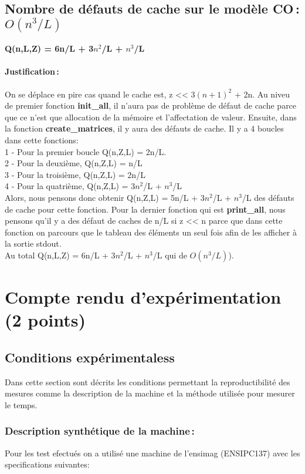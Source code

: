 \documentclass{article}
\begin{document}
  \subsection{Nombre de défauts de cache sur le modèle CO\,: $O(n^3/L)$}
  
 \hspace{4.5cm} \textbf{Q(n,L,Z) = 6n/L + 3$n^2$/L + $n^3$/L}
    \paragraph{Justification\,: }
    
    On se déplace en pire cas quand le cache est, z << $3(n+1)^2$ + 2n. Au niveu de premier fonction \textbf{init\_all}, il n'aura pas de problème de défaut de cache parce que ce n'est que allocation de la mémoire et l'affectation de valeur. Ensuite, dans la fonction \textbf{create\_matrices}, il y aura des défauts de cache. Il y a 4 boucles dans cette fonctions: \\ 
    1 - Pour la premier boucle Q(n,Z,L) = 2n/L. \\
    2 - Pour la deuxième,  Q(n,Z,L) = n/L \\
    3 - Pour la troisième, Q(n,Z,L) = 2n/L \\
    4 - Pour la quatrième, Q(n,Z,L) = 3$n^2$/L + $n^3$/L \\
    Alors, nous pensons donc obtenir Q(n,Z,L) = 5n/L + 3$n^2$/L + $n^3$/L des défauts de cache pour cette fonction.
    Pour la dernier fonction qui est \textbf{print\_all}, nous pensons qu'il y a des défaut de caches de n/L si z << n parce que dans cette fonction on parcours que le tableau des éléments un seul fois afin de les afficher à la sortie stdout.\\
    Au total Q(n,L,Z) = 6n/L + 3$n^2$/L + $n^3$/L qui de $O(n^3/L)$).
    
\section{Compte rendu d'expérimentation (2 points)}
  \subsection{Conditions expérimentaless}
     Dans cette section sont décrits les conditions permettant la reproductibilité des mesures comme la description de la machine et la méthode utilisée pour mesurer le temps.

    \subsubsection{Description synthétique de la machine\,:} 
        Pour les test efectués on a utilisé une machine de l'ensimag (ENSIPC137) avec les specifications suivantes: 
        
\end{document}
